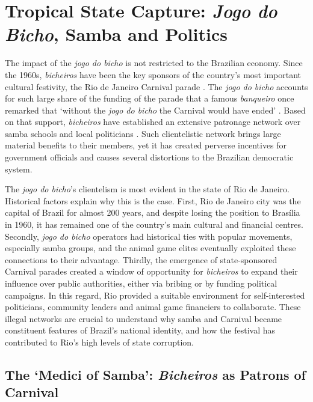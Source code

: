 \documentclass[a4paper,12pt]{article}
\begin{document}
\section{Tropical State Capture: \emph{Jogo do Bicho}, Samba and Politics}
\label{sec:capture}

The impact of the \emph{jogo do bicho} is not restricted to the Brazilian economy. Since the 1960s, \emph{bicheiros} have been the key sponsors of the country's most important cultural festivity, the Rio de Janeiro Carnival parade \citep{bezerra2009mecenato,cavalcanti2006carnaval,queiroz1992carnaval}. The \emph{jogo do bicho} accounts for such large share of the funding of the parade that a famous \emph{banqueiro} once remarked that `without the \emph{jogo do bicho} the Carnival would have ended' \citep{odia2016aniz}. Based on that support, \emph{bicheiros} have established an extensive patronage network over samba schools and local politicians \citetext{\citealp[4641]{arguello2012criminalizaccao}; \citealp{congressoemfoco2007bicho}; \citealp{jornaldobrasil2011bicho}; \citealp[16]{misse2011crime}}. Such clientelistic network brings large material benefits to their members, yet it has created perverse incentives for government officials and causes several distortions to the Brazilian democratic system.

The \emph{jogo do bicho}'s clientelism is most evident in the state of Rio de Janeiro. Historical factors explain why this is the case. First, Rio de Janeiro city was the capital of Brazil for almost 200 years, and despite losing the position to Brasília in 1960, it has remained one of the country's main cultural and financial centres. Secondly, \emph{jogo do bicho} operators had historical ties with popular movements, especially samba groups, and the animal game elites eventually exploited these connections to their advantage. Thirdly, the emergence of state-sponsored Carnival parades created a window of opportunity for \emph{bicheiros} to expand their influence over public authorities, either via bribing or by funding political campaigns. In this regard, Rio provided a suitable environment for self-interested politicians, community leaders and animal game financiers to collaborate. These illegal networks are crucial to understand why samba and Carnival became constituent features of Brazil's national identity, and how the festival has contributed to Rio's high levels of state corruption.

\subsection{The `Medici of Samba': \emph{Bicheiros} as Patrons of Carnival}
\label{sub:patrons}
\end{document}
